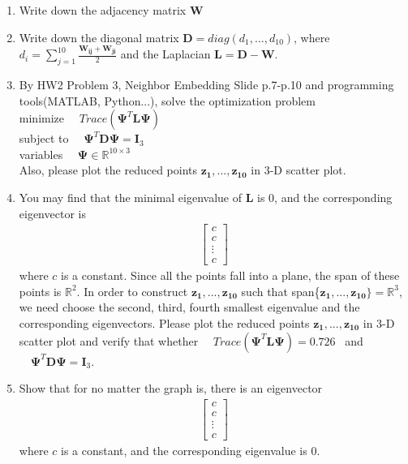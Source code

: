 \documentclass{article}
\begin{document}
\begin{enumerate}
    \item Write down the adjacency matrix $\boldsymbol{W}$
    \item Write down the diagonal matrix $\boldsymbol{D}=diag(d_1,...,d_{10})$, where $d_i=\sum_{j=1}^{10} \frac{\boldsymbol{W_{ij}}+\boldsymbol{W_{ji}}}{2}$ and the Laplacian $\boldsymbol{L}=\boldsymbol{D}-\boldsymbol{W}$.
    \item By HW2 Problem 3, Neighbor Embedding Slide p.7-p.10 and programming tools(MATLAB, Python...), solve the optimization problem \\
minimize  $\quad Trace(\boldsymbol{\Psi}^T \boldsymbol{L} \boldsymbol{\Psi})$ \\ 
subject to $\quad \boldsymbol{\Psi}^T \boldsymbol{D} \boldsymbol{\Psi} = \boldsymbol{I}_3$ \\
variables $\quad \boldsymbol{\Psi} \in \mathbb{R}^{10 \times 3}$ \\
Also, please plot the reduced points $\boldsymbol{z_1},...,\boldsymbol{z_{10}}$ in 3-D scatter plot.
\item You may find that the minimal eigenvalue of $\boldsymbol{L}$ is 0, and the corresponding eigenvector is 
\begin{align}
    \begin{bmatrix}
       c \\
       c \\
       \vdots \\
       c
     \end{bmatrix}
  \end{align}
  where $c$ is a constant. Since all the points fall into a plane, the span of these points is $\mathbb{R}^2$. In order to construct $\boldsymbol{z_1},...,\boldsymbol{z_{10}}$ such that span\{$\boldsymbol{z_1},...,\boldsymbol{z_{10}}\}=\mathbb{R}^3$, we need choose the second, third, fourth smallest eigenvalue and the corresponding eigenvectors. Please plot the reduced points $\boldsymbol{z_1},...,\boldsymbol{z_{10}}$ in 3-D scatter plot and verify that whether 
$\quad Trace(\boldsymbol{\Psi}^T \boldsymbol{L} \boldsymbol{\Psi})=0.726$ \ and $\quad \boldsymbol{\Psi}^T \boldsymbol{D} \boldsymbol{\Psi} = \boldsymbol{I}_3$.

\item Show that for no matter the graph is, there is an eigenvector \begin{align}
    \begin{bmatrix}
       c \\
       c \\
       \vdots \\
       c
     \end{bmatrix}
  \end{align}
  where $c$ is a constant, and the corresponding eigenvalue is 0.


\end{enumerate}
\end{document}
